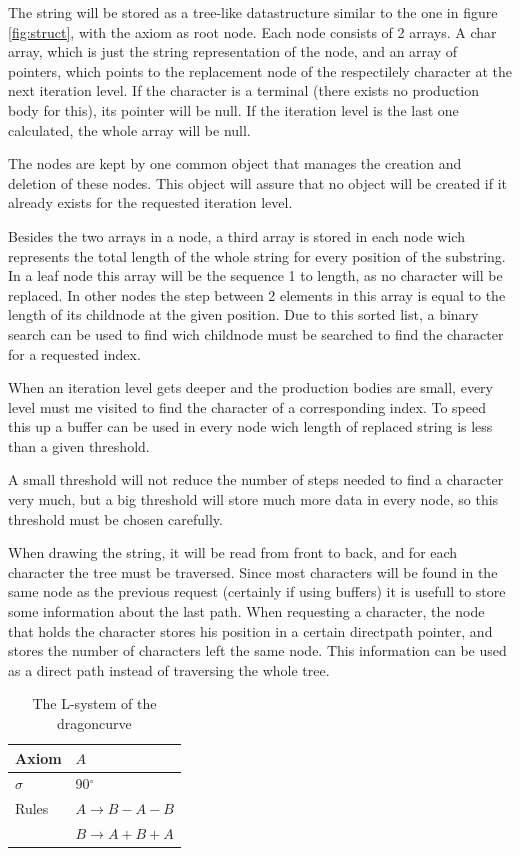 \documentclass[11pt,a4paper]{article}
\newcommand{\degree}{\ensuremath{^\circ}}
\begin{document}
The string will be stored as a tree-like datastructure similar to the one in figure \ref{fig:struct}, with the axiom as root node. Each node consists of 2 arrays. A char array, which is just the string representation of the node, and an array of pointers, which points to the replacement node of the respectilely character at the next iteration level. If the character is a terminal (there exists no production body for this), its pointer will be null. If the iteration level is the last one calculated, the whole array will be null.

The nodes are kept by one common object that manages the creation and deletion of these nodes. This object will assure that no object will be created if it already exists for the requested iteration level.

Besides the two arrays in a node, a third array is stored in each node wich represents the total length of the whole string for every position of the substring. In a leaf node this array will be the sequence 1 to length, as no character will be replaced. In other nodes the step between 2 elements in this array is equal to the length of its childnode at the given position. Due to this sorted list, a binary search can be used to find wich childnode must be searched to find the character for a requested index.

When an iteration level gets deeper and the production bodies are small, every level must me visited to find the character of a corresponding index. To speed this up a buffer can be used in every node wich length of replaced string is less than a given threshold.

A small threshold will not reduce the number of steps needed to find a character very much, but a big threshold will store much more data in every node, so this threshold must be chosen carefully.

When drawing the string, it will be read from front to back, and for each character the tree must be traversed. Since most characters will be found in the same node as the previous request (certainly if using buffers) it is usefull to store some information about the last path. When requesting a character, the node that holds the character stores his position in a certain directpath pointer, and stores the number of characters left the same node. This information can be used as a direct path instead of traversing the whole tree.

\begin{table}
\center
\begin{tabular}{l l}
Axiom & $A$ \\ \hline
$\sigma$ & 90\degree \\ \hline
Rules & $A \rightarrow B-A-B$ \\
      & $B \rightarrow A+B+A$ \\
\end{tabular}
\caption{The L-system of the dragoncurve}
\end{table}
\end{document}
